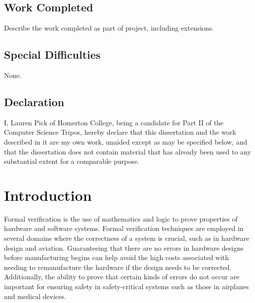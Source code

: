 \documentclass[12pt,a4paper,twoside,openright]{report}
\begin{document}
\section*{Work Completed}

Describe the work completed as part of project, including extensions.

\section*{Special Difficulties}

None.
 
\newpage
\section*{Declaration}

I, Lauren Pick of Homerton College, being a candidate for Part II of the Computer
Science Tripos, hereby declare
that this dissertation and the work described in it are my own work,
unaided except as may be specified below, and that the dissertation
does not contain material that has already been used to any substantial
extent for a comparable purpose.

\bigskip
{}

\medskip
{}

\tableofcontents





\pagestyle{headings}

\chapter{Introduction}


Formal verification is the use of mathematics and logic to prove properties of
hardware and software systems. Formal verification techniques are
employed in several domains where the correctness of a system is
crucial, such as in hardware design and aviation.
Guaranteeing that there are no errors in hardware designs before
manufacturing begins can help avoid the high costs associated with needing to
remanufacture the hardware if the design needs to be corrected.
Additionally, the ability to prove that certain kinds of errors do not
occur are important for ensuring safety in safety-critical systems such
as those in airplanes and medical devices.
\end{document}
